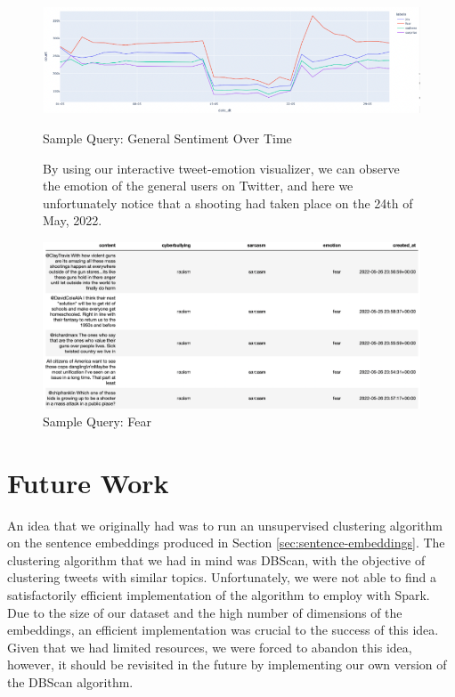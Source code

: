 \documentclass[a4paper,12pt]{article}
\begin{document}
\begin{figure}[h!]
{\centering
	\includegraphics[width=\textwidth]{graph.png}
	\caption{Sample Query: General Sentiment Over Time}
	\label{fig:Emotion-Time-Query}
}
	\vspace{5mm} %
By using our interactive tweet-emotion visualizer, we can
observe the emotion of the general users on Twitter, and here we unfortunately notice that a shooting had taken place
on the 24th of May, 2022.
	{
	\centering
	\includegraphics[width=\textwidth]{graphTweets.png}
	\caption{Sample Query: Fear}
	\label{fig:Fear-Query}
}
\end{figure}

\section{Future Work}
An idea that we originally had was to run an unsupervised clustering algorithm on the sentence embeddings produced in Section \ref{sec:sentence-embeddings}. The clustering algorithm that we had in mind was DBScan\cite{Ester96adensity-based}, with the objective of clustering tweets with similar topics. Unfortunately, we were not able to find a satisfactorily efficient implementation of the algorithm to employ with Spark. Due to the size of our dataset and the high number of dimensions of the embeddings, an efficient implementation was crucial to the success of this idea. Given that we had limited resources, we were forced to abandon this idea, however, it should be revisited in the future by implementing our own version of the DBScan algorithm.
\end{document}
